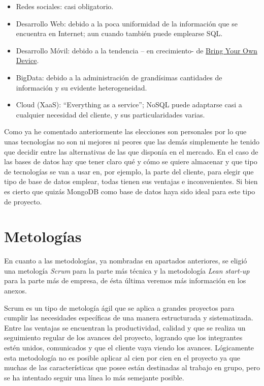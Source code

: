       \begin{itemize}
      \item Redes sociales: casi obligatorio.
	  \item Desarrollo Web: debido a la poca uniformidad de la información que se encuentra en Internet; aun cuando también puede emplearse SQL.
  \item Desarrollo Móvil: debido a la tendencia – en crecimiento- de \hyperlink{ https://es.wikipedia.org/wiki/Bring_your_own_device
}{Bring Your Own Device}.
  \item BigData: debido a la administración de grandísimas cantidades de información y su evidente heterogeneidad.
  \item Cloud (XaaS): “Everything as a service”; NoSQL puede adaptarse casi a cualquier necesidad del cliente, y sus particularidades varias.
    \end{itemize}
   
    Como ya he comentado anteriormente las elecciones son personales por lo que unas tecnologías no son ni mejores ni peores que las demás simplemente he tenido que decidir entre las alternativas de las que disponía en el mercado. En el caso de las bases de datos hay que tener claro qué y cómo se quiere almacenar y que tipo de tecnologías se van a usar en, por ejemplo, la parte del cliente, para elegir que tipo de base de datos emplear, todas tienen sus ventajas e inconvenientes. Si bien es cierto que quizás MongoDB como base de datos haya sido ideal para este tipo de proyecto.

  \section{Metologías}\label{metodologia}

En cuanto a las metodologías, ya nombradas en apartados anteriores, se eligió una metología \emph{Scrum} para la parte más técnica y la metodología \emph{Lean start-up} para la parte más de empresa, de ésta última veremos más información en los anexos.

Scrum es un tipo de metología ágil que se aplica a grandes proyectos para cumplir las necesidades específicas de una manera estructurada y sistematizada. Entre las ventajas se encuentran la productividad, calidad y que se realiza un seguimiento regular de los avances del proyecto, logrando que los integrantes estén unidos, comunicados y que el cliente vaya viendo los avances. Lógicamente esta metodología no es posible aplicar al cien por cien en el proyecto ya que muchas de las características que posee están destinadas al trabajo en grupo, pero se ha intentado seguir una línea lo más semejante posible. 

